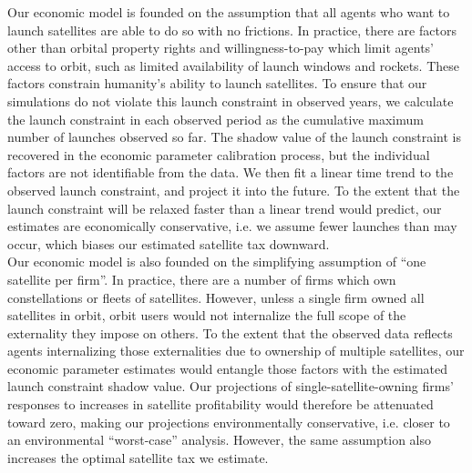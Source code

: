 \documentclass[12pt]{article}
\begin{document}
Our economic model is founded on the assumption that all agents who want to launch satellites are able to do so with no frictions. In practice, there are factors other than orbital property rights and willingness-to-pay which limit agents' access to orbit, such as limited availability of launch windows and rockets. These factors constrain humanity's ability to launch satellites. To ensure that our simulations do not violate this launch constraint in observed years, we calculate the launch constraint in each observed period as the cumulative maximum number of launches observed so far. The shadow value of the launch constraint is recovered in the economic parameter calibration process, but the individual factors are not identifiable from the data. We then fit a linear time trend to the observed launch constraint, and project it into the future. To the extent that the launch constraint will be relaxed faster than a linear trend would predict, our estimates are economically conservative, i.e. we assume fewer launches than may occur, which biases our estimated satellite tax downward. \\

Our economic model is also founded on the simplifying assumption of ``one satellite per firm''. In practice, there are a number of firms which own constellations or fleets of satellites. However, unless a single firm owned all satellites in orbit, orbit users would not internalize the full scope of the externality they impose on others. To the extent that the observed data reflects agents internalizing those externalities due to ownership of multiple satellites, our economic parameter estimates would entangle those factors with the estimated launch constraint shadow value. Our projections of single-satellite-owning firms' responses to increases in satellite profitability would therefore be attenuated toward zero, making our projections environmentally conservative, i.e. closer to an environmental ``worst-case'' analysis. However, the same assumption also increases the optimal satellite tax we estimate. \\
\end{document}

